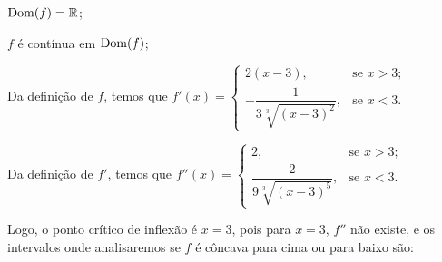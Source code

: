 \cleardoublepage\documentclass[../main.tex]{subfiles}
\begin{document}
\begin{compactenum}[a)]
\begin{solution}
\begin{compactenum}[i.]
\item \({\rm Dom}(f)=\mathbb{R}\);
\item \(f\) é contínua em \({\rm Dom}(f)\);
\item Da definição de \(f\), temos que \(f'(x)=\left\{\begin{array}{ll} 2(x-3),& \mbox{se } x> 3;\\ -\dfrac{1}{3\sqrt[3]{(x-3)^2}}, & \mbox{se } x< 3. \end{array}\right.\)
\item Da definição de \(f'\), temos que \(f''(x)=\left\{\begin{array}{ll} 2,& \mbox{se } x> 3;\\ \dfrac{2}{9\sqrt[3]{(x-3)^5}},& \mbox{se } x< 3. \end{array}\right.\)

Logo, o ponto crítico de inflexão é \(x=3\), pois para \(x=3\), \(f''\) não existe, e os intervalos onde analisaremos se \(f\) é côncava para cima ou para baixo são:


\end{compactenum}
\end{solution}
\end{compactenum}
\end{document}
